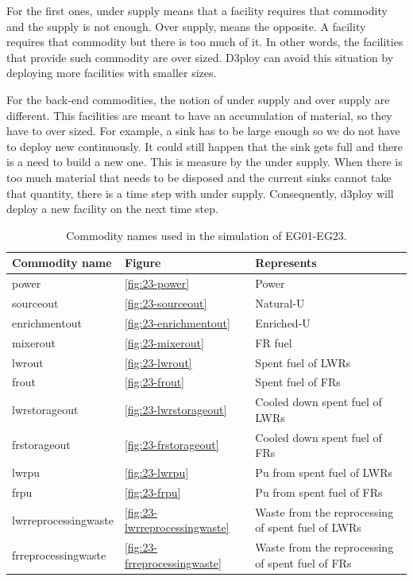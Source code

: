 \documentclass[11pt]{article}
\begin{document}
For the first ones, under supply means that a facility requires that commodity and the supply is not enough. Over supply, means the opposite. A facility requires that commodity but there is too much of it. In other words, the facilities that provide such commodity are over sized. D3ploy can avoid this situation by deploying more facilities with smaller sizes.

For the back-end commodities, the notion of under supply and over supply are different. This facilities are meant to have an accumulation of material, so they have to over sized. For example, a sink has to be large enough so we do not have to deploy new continuously. It could still happen that the sink gets full and there is a need to build a new one. This is measure by the under supply. When there is too much material that needs to be disposed and the current sinks cannot take that quantity, there is a time step with under supply. Consequently, d3ploy will deploy a new facility on the next time step.

\begin{table}[H]
	\centering
	\caption{Commodity names used in the simulation of EG01-EG23.}
	\label{tab:23-commodities}
	\begin{tabularx}{\textwidth}{lLL}
		\hline
		Commodity name  & Figure & Represents \\ \hline
  		power           & \ref{fig:23-power} & Power \\
		sourceout       & \ref{fig:23-sourceout} & Natural-U \\
        enrichmentout   & \ref{fig:23-enrichmentout} & Enriched-U \\
        mixerout        & \ref{fig:23-mixerout} & FR fuel \\
  		lwrout          & \ref{fig:23-lwrout} & Spent fuel of LWRs \\
  		frout           & \ref{fig:23-frout} & Spent fuel of FRs \\
  		lwrstorageout   & \ref{fig:23-lwrstorageout} & Cooled down spent fuel of LWRs \\
  		frstorageout    & \ref{fig:23-frstorageout} & Cooled down spent fuel of FRs \\	
  		lwrpu   & \ref{fig:23-lwrpu} & Pu from spent fuel of LWRs \\
  		frpu    & \ref{fig:23-frpu} & Pu from spent fuel of FRs \\
  		lwrreprocessingwaste & \ref{fig:23-lwrreprocessingwaste} & Waste from the reprocessing of spent fuel of LWRs \\
 		frreprocessingwaste & \ref{fig:23-frreprocessingwaste} & Waste from the reprocessing of spent fuel of FRs \\ \hline

	\end{tabularx}
\end{table}
\end{document}
